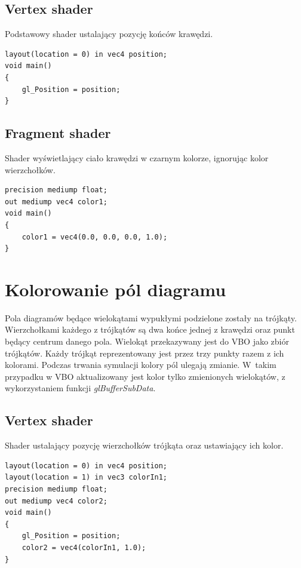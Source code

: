 \documentclass[declaration,shortabstract, inz]{iithesis}
\theoremstyle{definition} \newtheorem{definition}{Definicja}[]
\theoremstyle{plain} \newtheorem{remark}[definition]{Obserwacja}
\theoremstyle{plain} \newtheorem{theorem}[definition]{Twierdzenie}
\theoremstyle{plain} \newtheorem{example}{Przykład}[definition]
\theoremstyle{plain} \newtheorem{lemma}[definition]{Lemat}
\begin{document}
\subsection{Vertex shader}
Podstawowy shader ustalający pozycję końców krawędzi.
\begin{center}
\begin{lstlisting}
layout(location = 0) in vec4 position;
void main()
{
	gl_Position = position;
}
\end{lstlisting}
\end{center}

\subsection{Fragment shader}
Shader wyświetlający ciało krawędzi w czarnym kolorze, ignorując kolor wierzchołków.
\begin{center}
\begin{lstlisting}
precision mediump float;
out mediump vec4 color1;
void main()
{
	color1 = vec4(0.0, 0.0, 0.0, 1.0);
}
\end{lstlisting}
\end{center}

\section{Kolorowanie pól diagramu}

Pola diagramów będące wielokątami wypukłymi podzielone zostały na trójkąty. Wierzchołkami każdego z trójkątów są dwa końce jednej z krawędzi oraz punkt będący centrum danego pola. Wielokąt przekazywany jest do VBO jako zbiór trójkątów. Każdy trójkąt reprezentowany jest przez trzy punkty razem z ich kolorami. Podczas trwania symulacji kolory pól ulegają zmianie. W~takim przypadku w VBO aktualizowany jest kolor tylko zmienionych wielokątów, z wykorzystaniem funkcji \textit{glBufferSubData}.

\subsection{Vertex shader}
Shader ustalający pozycję wierzchołków trójkąta oraz ustawiający ich kolor.
\begin{center}
\begin{lstlisting}
layout(location = 0) in vec4 position;
layout(location = 1) in vec3 colorIn1;
precision mediump float;
out mediump vec4 color2;
void main()
{
	gl_Position = position;
	color2 = vec4(colorIn1, 1.0);
}
\end{lstlisting}
\end{center}
\end{document}
